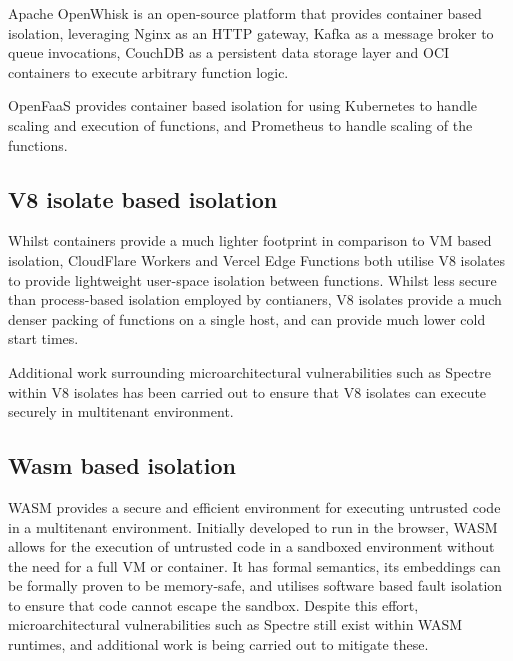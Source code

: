 Apache OpenWhisk\cite{apacheOpenWhisk2024} is an open-source \faas{} platform that provides container based isolation, leveraging Nginx as an HTTP gateway, Kafka as a message broker to queue invocations, CouchDB as a persistent data storage layer and OCI containers to execute arbitrary function logic.

OpenFaaS\cite{ellisOpenFaaS2024} provides container based isolation for \faas{} using Kubernetes to handle scaling and execution of functions, and Prometheus to handle scaling of the functions.

\subsection{V8 isolate based isolation}
Whilst containers provide a much lighter footprint in comparison to VM based isolation, CloudFlare Workers\cite{CloudComputingContainers2018} and Vercel Edge Functions\cite{EdgeRuntime} both utilise V8 isolates to provide lightweight user-space isolation between functions. Whilst less secure than process-based isolation employed by contianers, V8 isolates provide a much denser packing of functions on a single host, and can provide much lower cold start times.

Additional work surrounding microarchitectural vulnerabilities such as Spectre within V8 isolates has been carried out to ensure that V8 isolates can execute securely in multitenant environment\cite{schwarzlRobustScalableProcess2022}.

\subsection{Wasm based isolation}
\label{sec:faas-wasm-isolation}
WASM provides a secure and efficient environment for executing untrusted code\cite{WebAssembly} in a multitenant environment. Initially developed to run in the browser, WASM allows for the execution of untrusted code in a sandboxed environment without the need for a full VM or container. It has formal semantics\cite{haasBringingWebSpeed2017}, its embeddings can be formally proven to be memory-safe\cite{SecurefoundationsVWasm2024}, and utilises software based fault isolation to ensure that code cannot escape the sandbox\cite{SecurityWebAssembly}. Despite this effort, microarchitectural vulnerabilities such as Spectre still exist within WASM runtimes, and additional work is being carried out to mitigate these\cite{narayanSwivelHardeningWebAssembly2021}.

